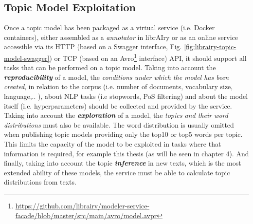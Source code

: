 \subsection{Topic Model Exploitation}
\label{sec:topic-model-exploitation}

Once a topic model has been packaged as a virtual service (i.e. Docker containers), either assembled as a \textit{annotator} in librAIry or as an online service accessible via its HTTP (based on a Swagger interface, Fig. \ref{fig:librairy-topic-model-swagger}) or TCP (based on an Avro\footnote{\url{https://github.com/librairy/modeler-service-facade/blob/master/src/main/avro/model.avpr}} interface) API, it should support all tasks that can be performed on a topic model. Taking into account the \textbf{\textit{reproducibility}} of a model, the \textit{conditions under which the model has been created}, in relation to the corpus (i.e. number of documents, vocabulary size, language,.. ), about NLP tasks (i.e stopwords, PoS filtering) and about the model itself (i.e. hyperparameters) should be collected and provided by the service. Taking into account the \textbf{\textit{exploration}} of a model, the \textit{topics and their word distributions} must also be available. The word distribution is usually omitted when publishing topic models providing only the top10 or top5 words per topic. This limits the capacity of the model to be exploited in tasks where that information is required, for example this thesis (as will be seen in chapter 4). And finally, taking into account the topic \textbf{\textit{inference}} in new texts, which is the most extended ability of these models, the service must be able to calculate topic distributions from texts.

